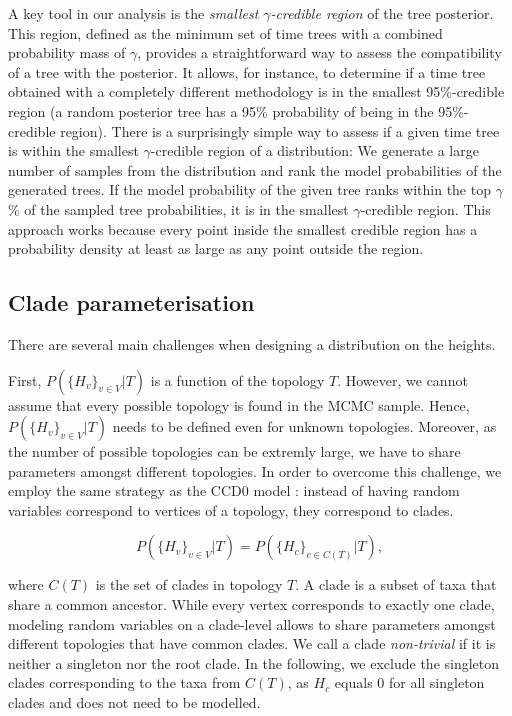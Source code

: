 \documentclass[10pt,letterpaper]{article}
\newcommand{\Pro}[1]{P\left(#1\right)}
\begin{document}
A key tool in our analysis is the \emph{smallest $\gamma$-credible region} of the tree posterior. This region, defined as the minimum set of time trees with a combined probability mass of $\gamma$, provides a straightforward way to assess the compatibility of a tree with the posterior. It allows, for instance, to determine if a time tree obtained with a completely different methodology is in the smallest 95\%-credible region (a random posterior tree has a 95\% probability of being in the 95\%-credible region). There is a surprisingly simple way to assess if a given time tree is within the smallest $\gamma$-credible region of a distribution: We generate a large number of samples from the distribution and rank the model probabilities of the generated trees. If the model probability of the given tree ranks within the top $\gamma$\% of the sampled tree probabilities, it is in the smallest $\gamma$-credible region. This approach works because every point inside the smallest credible region has a probability density at least as large as any point outside the region.

\subsection*{Clade parameterisation}

There are several main challenges when designing a distribution on the heights.

First, $P\left(\{H_v\}_{v \in V} | T\right)$ is a function of the topology $T$. However, we cannot assume that every possible topology is found in the MCMC sample. Hence, $P\left(\{H_v\}_{v \in V} | T\right)$ needs to be defined even for unknown topologies. Moreover, as the number of possible topologies can be extremly large, we have to share parameters amongst different topologies. In order to overcome this challenge, we employ the same strategy as the CCD0 model \cite{ccd}: instead of having random variables correspond to vertices of a topology, they correspond to clades.

$$
\Pro{\{H_v\}_{v \in V} | T} = \Pro{\{H_c\}_{c \in C(T)} | T},
$$

where $C(T)$ is the set of clades in topology $T$. A clade is a subset of taxa that share a common ancestor. While every vertex corresponds to exactly one clade, modeling random variables on a clade-level allows to share parameters amongst different topologies that have common clades. We call a clade \emph{non-trivial} if it is neither a singleton nor the root clade. In the following, we exclude the singleton clades corresponding to the taxa from $C(T)$, as $H_c$ equals $0$ for all singleton clades and does not need to be modelled. 
\end{document}
